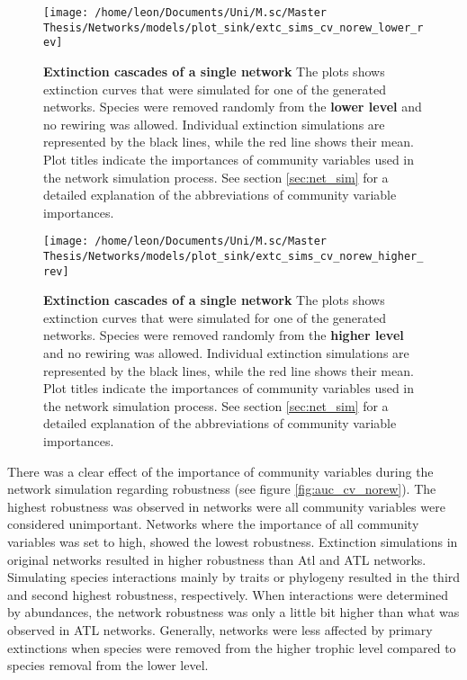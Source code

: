 \documentclass[12pt,a4paper]{article}
\begin{document}
\begin{figure}[H]
	 \centering
	 \texttt{[image: /home/leon/Documents/Uni/M.sc/Master Thesis/Networks/models/plot\_sink/extc\_sims\_cv\_norew\_lower\_rev]}
	 \captionsetup{width = \textwidth}
	 \caption{\textbf{Extinction cascades of a single network} The plots shows extinction curves that were simulated for one of the generated networks. Species were removed randomly from the \textbf{lower level} and no rewiring was allowed. Individual extinction simulations are represented by the black lines, while the red line shows their mean. Plot titles indicate the importances of community variables used in the network simulation process. See section \ref{sec:net_sim} for a detailed explanation of the abbreviations of community variable importances.}
	 \label{fig:extc_cv_norew_lower}
\end{figure}


\begin{figure}[H]
	 \centering
	 \texttt{[image: /home/leon/Documents/Uni/M.sc/Master Thesis/Networks/models/plot\_sink/extc\_sims\_cv\_norew\_higher\_rev]}
	 \captionsetup{width = \textwidth}
	 \caption{\textbf{Extinction cascades of a single network} The plots shows extinction curves that were simulated for one of the generated networks. Species were removed randomly from the \textbf{higher level} and no rewiring was allowed. Individual extinction simulations are represented by the black lines, while the red line shows their mean. Plot titles indicate the importances of community variables used in the network simulation process. See section \ref{sec:net_sim} for a detailed explanation of the abbreviations of community variable importances.}
	 \label{fig:extc_cv_norew_higher}
\end{figure}

There was a clear effect of the importance of community variables during the network simulation regarding robustness (see figure \ref{fig:auc_cv_norew}). The highest robustness was observed in networks were all community variables were considered unimportant. Networks where the importance of all community variables was set to high, showed the lowest robustness. Extinction simulations in original networks resulted in higher robustness than Atl and ATL networks. Simulating species interactions mainly by traits or phylogeny resulted in the third and second highest robustness, respectively. When interactions were determined by abundances, the network robustness was only a little bit higher than what was observed in ATL networks. Generally, networks were less affected by primary extinctions when species were removed from the higher trophic level compared to species removal from the lower level. \par
\end{document}

